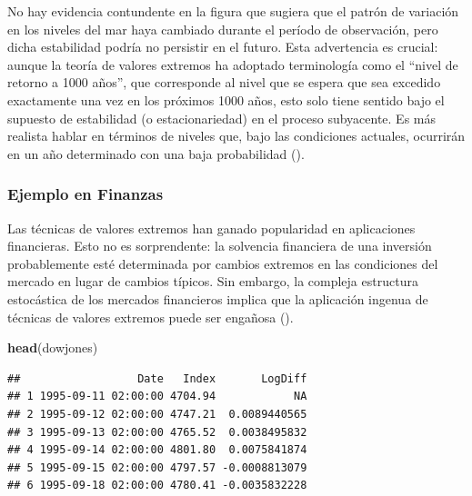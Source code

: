 \documentclass[
  20pt,
]{book}
\newenvironment{Shaded}{\begin{snugshade}}{\end{snugshade}}
\newcommand{\ConstantTok}[1]{\textcolor[rgb]{0.56,0.35,0.01}{#1}}
\newcommand{\FunctionTok}[1]{\textcolor[rgb]{0.13,0.29,0.53}{\textbf{#1}}}
\newcommand{\NormalTok}[1]{#1}
\newcommand{\OtherTok}[1]{\textcolor[rgb]{0.56,0.35,0.01}{#1}}
\newcommand{\SpecialCharTok}[1]{\textcolor[rgb]{0.81,0.36,0.00}{\textbf{#1}}}
\theoremstyle{definition}
\theoremstyle{definition}
\theoremstyle{definition}
\theoremstyle{definition}
\theoremstyle{remark}
\begin{document}
No hay evidencia contundente en la figura que sugiera que el patrón de variación en los niveles del mar haya cambiado durante el período de observación, pero dicha estabilidad podría no persistir en el futuro. Esta advertencia es crucial: aunque la teoría de valores extremos ha adoptado terminología como el ``nivel de retorno a 1000 años'', que corresponde al nivel que se espera que sea excedido exactamente una vez en los próximos 1000 años, esto solo tiene sentido bajo el supuesto de estabilidad (o estacionariedad) en el proceso subyacente. Es más realista hablar en términos de niveles que, bajo las condiciones actuales, ocurrirán en un año determinado con una baja probabilidad (\citet{coles2001introduction}).

\subsubsection{Ejemplo en Finanzas}\label{ejemplo-en-finanzas}

Las técnicas de valores extremos han ganado popularidad en aplicaciones financieras. Esto no es sorprendente: la solvencia financiera de una inversión probablemente esté determinada por cambios extremos en las condiciones del mercado en lugar de cambios típicos. Sin embargo, la compleja estructura estocástica de los mercados financieros implica que la aplicación ingenua de técnicas de valores extremos puede ser engañosa (\citet{coles2001introduction}).

\begin{Shaded}
\end{Shaded}

\begin{Shaded}
\begin{Highlighting}[]
\FunctionTok{head}\NormalTok{(dowjones)}
\end{Highlighting}
\end{Shaded}

\begin{verbatim}
##                  Date   Index       LogDiff
## 1 1995-09-11 02:00:00 4704.94            NA
## 2 1995-09-12 02:00:00 4747.21  0.0089440565
## 3 1995-09-13 02:00:00 4765.52  0.0038495832
## 4 1995-09-14 02:00:00 4801.80  0.0075841874
## 5 1995-09-15 02:00:00 4797.57 -0.0008813079
## 6 1995-09-18 02:00:00 4780.41 -0.0035832228
\end{verbatim}
\end{document}
